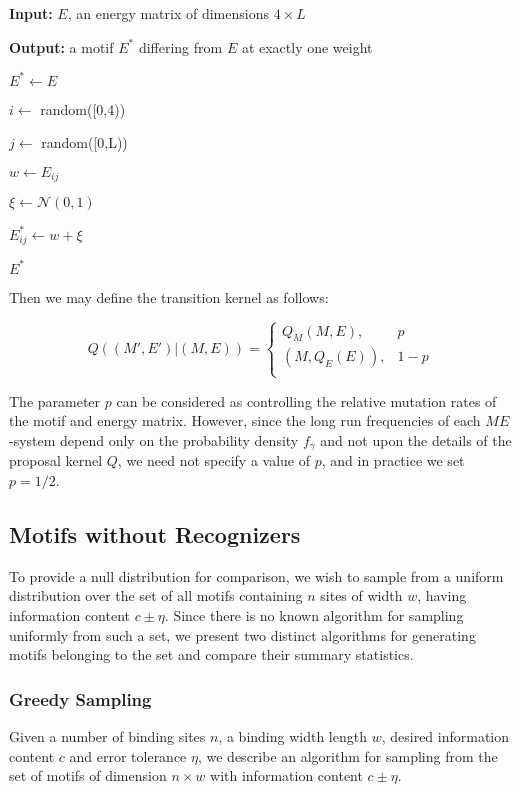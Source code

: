 \documentclass{article}
\renewcommand{\KwData}{\textbf{Input: }}
\renewcommand{\KwResult}{\textbf{Output: }}
\begin{document}
\begin{algorithm}[H]
  \SetLine
  \KwData{$E$, an energy matrix of dimensions $4\times L$}
  
  \KwResult{a motif $E^*$ differing from $E$ at exactly one weight}
  
  $E^{*} \leftarrow E$

   $i\leftarrow$ random([0,4))

   $j\leftarrow$ random([0,L))
   
   $w\leftarrow E_{ij}$

   $\xi \leftarrow \mathcal{N}(0,1)$

   $E^{*}_{ij} \leftarrow w + \xi$ 

   \Return $E^*$
   \caption{$Q_E$}
   \label{alg:mutate_energy_matrix}
\end{algorithm}

Then we may define the transition kernel as follows:

\begin{equation}
  \label{eq:transition_kernel}
  Q((M',E')|(M,E)) =
  \begin{cases}
    Q_M(M,E),& p\\
    (M,Q_E(E)),& 1-p\\
  \end{cases}
\end{equation}

The parameter $p$ can be considered as controlling the relative
mutation rates of the motif and energy matrix.  However, since the
long run frequencies of each $ME$-system depend only on the
probability density $f_\gamma$ and not upon the details of the proposal
kernel $Q$, we need not specify a value of $p$, and in practice we set
$p=1/2$.

\subsection{Motifs without Recognizers}
To provide a null distribution for comparison, we wish to sample from
a uniform distribution over the set of all motifs containing $n$ sites
of width $w$, having information content $c\pm\eta$.  Since there
is no known algorithm for sampling uniformly from such a set, we
present two distinct algorithms for generating motifs belonging to the
set and compare their summary statistics.

\subsubsection{Greedy Sampling}
Given a number of binding sites $\mathit{n}$, a
binding width length $\mathit{w}$, desired information content
$\mathit{c}$ and error tolerance $\mathit{\eta}$, we describe an
algorithm for sampling from the set of motifs of dimension $n\times w$
with information content $c\pm \eta$.
\end{document}

